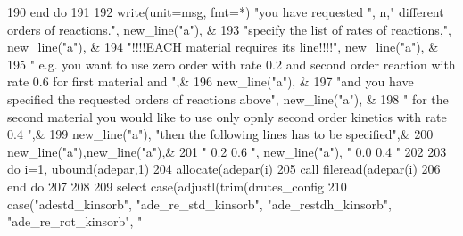 \begin{DoxyCode}
{{{{{190 \textcolor{stringliteral}{}\textcolor{stringliteral}{       end do}
191 \textcolor{stringliteral}{}\textcolor{stringliteral}{       }
192 \textcolor{stringliteral}{}\textcolor{stringliteral}{       write(unit=msg, fmt=*) "}you have requested \textcolor{stringliteral}{", n,"} different orders\textcolor{comment}{ of reactions.}\textcolor{stringliteral}{", new\_line("}a\textcolor{stringliteral}{"), &}
193 \textcolor{stringliteral}{}\textcolor{stringliteral}{           "}specify the list of rates of reactions,\textcolor{stringliteral}{", new\_line("}a\textcolor{stringliteral}{"), &}
194 \textcolor{stringliteral}{}\textcolor{stringliteral}{           "}!\textcolor{comment}{!!!EACH material requires its line!!!!",  new\_line("a"), &}
195            \textcolor{stringliteral}{"    e.g. you want to use zero order with rate 0.2 and second order reaction with rate 0.6 for
       first material and "}\textcolor{comment}{,&}
196 \textcolor{comment}{           new\_line(}\textcolor{stringliteral}{"a"}), & 
197            \textcolor{stringliteral}{"and you have specified the requested orders of reactions above"},  new\_line\textcolor{comment}{(}\textcolor{stringliteral}{"a"}\textcolor{comment}{), & }
198 \textcolor{comment}{           }\textcolor{stringliteral}{" for the second material you would like to use only  opnly second order kinetics with rate 0.4
       "}\textcolor{comment}{,& }
199 \textcolor{comment}{           new\_line(}\textcolor{stringliteral}{"a"}), \textcolor{stringliteral}{"then the following lines has to be specified"},&
200            new\_line(\textcolor{stringliteral}{"a"}),new\_line(\textcolor{stringliteral}{"a"}),&
201            " 0.2 0.6 \textcolor{stringliteral}{", new\_line("}a\textcolor{stringliteral}{"), "} 0.0 0.4 \textcolor{stringliteral}{"}
202 \textcolor{stringliteral}{}\textcolor{stringliteral}{           }
203 \textcolor{stringliteral}{}\textcolor{stringliteral}{       do i=1, ubound(adepar,1)}
204 \textcolor{stringliteral}{}\textcolor{stringliteral}{         allocate(adepar(i)%
205 \textcolor{stringliteral}{}\textcolor{stringliteral}{         call fileread(adepar(i)%
206 \textcolor{stringliteral}{}\textcolor{stringliteral}{       end do   }
207 \textcolor{stringliteral}{}\textcolor{stringliteral}{}
208 \textcolor{stringliteral}{}\textcolor{stringliteral}{       }
209 \textcolor{stringliteral}{}\textcolor{stringliteral}{       select case(adjustl(trim(drutes\_config%
210 \textcolor{stringliteral}{}\textcolor{stringliteral}{          case("}adestd\_kinsorb\textcolor{stringliteral}{", "}ade\_re\_std\_kinsorb\textcolor{stringliteral}{", "}ade\_restdh\_kinsorb\textcolor{stringliteral}{", "}ade\_re\_rot\_kinsorb\textcolor{stringliteral}{", "}
}}}}}}}}
\end{DoxyCode}
